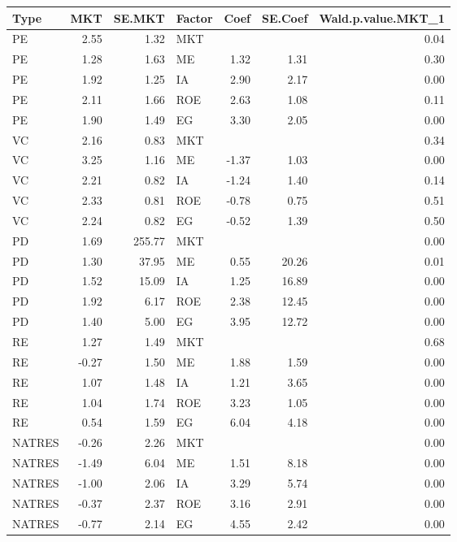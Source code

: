 \documentclass[12pt]{article}
\begin{document}
\begin{table}[ht]
	\centering
	\begin{tabular}{lrrlrrr}
		Type & MKT & SE.MKT & Factor & Coef & SE.Coef & Wald.p.value.MKT\_1 \\ 
		\hline
		\hline
		PE & 2.55 & 1.32 & MKT &  &  & 0.04 \\ 
		PE & 1.28 & 1.63 & ME & 1.32 & 1.31 & 0.30 \\ 
		PE & 1.92 & 1.25 & IA & 2.90 & 2.17 & 0.00 \\ 
		PE & 2.11 & 1.66 & ROE & 2.63 & 1.08 & 0.11 \\ 
		PE & 1.90 & 1.49 & EG & 3.30 & 2.05 & 0.00 \\ 
		\hline
		VC & 2.16 & 0.83 & MKT &  &  & 0.34 \\ 
		VC & 3.25 & 1.16 & ME & -1.37 & 1.03 & 0.00 \\ 
		VC & 2.21 & 0.82 & IA & -1.24 & 1.40 & 0.14 \\ 
		VC & 2.33 & 0.81 & ROE & -0.78 & 0.75 & 0.51 \\ 
		VC & 2.24 & 0.82 & EG & -0.52 & 1.39 & 0.50 \\ 
		\hline
		PD & 1.69 & 255.77 & MKT &  &  & 0.00 \\ 
		PD & 1.30 & 37.95 & ME & 0.55 & 20.26 & 0.01 \\ 
		PD & 1.52 & 15.09 & IA & 1.25 & 16.89 & 0.00 \\ 
		PD & 1.92 & 6.17 & ROE & 2.38 & 12.45 & 0.00 \\ 
		PD & 1.40 & 5.00 & EG & 3.95 & 12.72 & 0.00 \\ 
		\hline
		RE & 1.27 & 1.49 & MKT &  &  & 0.68 \\ 
		RE & -0.27 & 1.50 & ME & 1.88 & 1.59 & 0.00 \\ 
		RE & 1.07 & 1.48 & IA & 1.21 & 3.65 & 0.00 \\ 
		RE & 1.04 & 1.74 & ROE & 3.23 & 1.05 & 0.00 \\ 
		RE & 0.54 & 1.59 & EG & 6.04 & 4.18 & 0.00 \\ 
		\hline
		NATRES & -0.26 & 2.26 & MKT &  &  & 0.00 \\ 
		NATRES & -1.49 & 6.04 & ME & 1.51 & 8.18 & 0.00 \\ 
		NATRES & -1.00 & 2.06 & IA & 3.29 & 5.74 & 0.00 \\ 
		NATRES & -0.37 & 2.37 & ROE & 3.16 & 2.91 & 0.00 \\ 
		NATRES & -0.77 & 2.14 & EG & 4.55 & 2.42 & 0.00 \\ 

\end{tabular}
\end{table}
\end{document}

